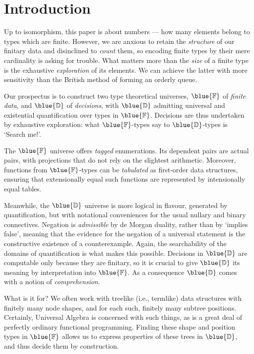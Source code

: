 \documentclass[acmsmall,review,prologue,dvipsnames,bookmarks=false]{acmart}
\newcommand{\remph}{\emph}  %
\newcommand{\D}[1]{\blue{\mathsf{#1}}}
\newcommand{\DU}[1]{\D{\mathbb{#1}}}
\newcommand{\UF}{\DU{F}}
\newcommand{\UD}{\DU{D}}
\begin{document}
\section{Introduction}\label{sec:intro}

Up to isomorphism, this paper is about numbers --- how many elements belong to types which are finite. However, we are anxious to retain the \remph{structure} of our finitary data and disinclined to \remph{count} them, so encoding finite types by their mere cardinality is asking for trouble. What matters more than the \remph{size} of a finite type is the exhaustive \remph{exploration} of its elements. We can achieve the latter with more sensitivity than the British method of forming an orderly queue.

Our prospectus is to construct two type theoretical universes, $\UF$ of \remph{finite data}, and $\UD$ of \remph{decisions}, with $\UD$ admitting universal and existential quantification over types in $\UF$. Decisions are thus undertaken by exhaustive exploration: what $\UF$-types say to $\UD$-types is `Search me!'.

The $\UF$ universe offers \remph{tagged} enumerations. Its dependent pairs are actual pairs, with projections that do not rely on the slightest arithmetic. Moreover, functions from $\UF$-types can be \remph{tabulated} as first-order data structures, ensuring that extensionally equal such functions are represented by intensionally equal tables.

Meanwhile, the $\UD$ universe is more logical in flavour, generated by quantification, but with notational conveniences for the usual nullary and binary connectives. Negation is \remph{admissible} by de Morgan duality, rather than by `implies false', meaning that the evidence for the negation of a universal statement is the constructive existence of a counterexample. Again, the searchability of the domains of quantification is what makes this possible. Decisions in $\UD$ are computable only because they are finitary, so it is crucial to give $\UD$ its meaning by interpretation into $\UF$. As a consequence $\UD$ comes with a notion of \remph{comprehension}.

What is it for? We often work with treelike (i.e., termlike) data structures with finitely many node shapes, and for each such, finitely many subtree positions. Certainly, Universal Algebra is concerned with such things, as is a great deal of perfectly ordinary functional programming. Finding these shape and position types in $\UF$ allows us to express properties of these trees in $\UD$, and thus decide them by construction.
\end{document}

